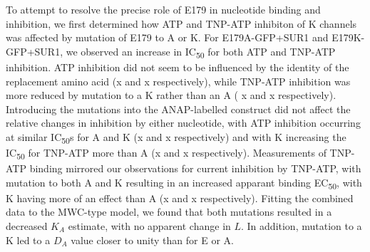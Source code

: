 To attempt to resolve the precise role of E179 in nucleotide binding and inhibition, we first determined how ATP and TNP-ATP inhibiton of K\ATP{} channels was affected by mutation of E179 to A or K.
For E179A-GFP+SUR1 and E179K-GFP+SUR1, we observed an increase in IC\textsubscript{50} for both ATP and TNP-ATP inhibition.
ATP inhibition did not seem to be influenced by the identity of the replacement amino acid (x and x respectively), while TNP-ATP inhibition was more reduced by mutation to a K rather than an A ( x and x respectively).
Introducing the mutations into the ANAP-labelled construct did not affect the relative changes in inhibition by either nucleotide, with ATP inhibition occurring at similar IC\textsubscript{50}s for A and K (x and x respectively) and with K increasing the IC\textsubscript{50} for TNP-ATP more than A (x and x respectively).
Measurements of TNP-ATP binding mirrored our observations for current inhibition by TNP-ATP, with mutation to both A and K resulting in an increased apparant binding EC\textsubscript{50}, with K having more of an effect than A (x and x respectively).
Fitting the combined data to the MWC-type model, we found that both mutations resulted in a decreased $K_A$ estimate, with no apparent change in $L$.
In addition, mutation to a K led to a $D_A$ value closer to unity than for E or A.

